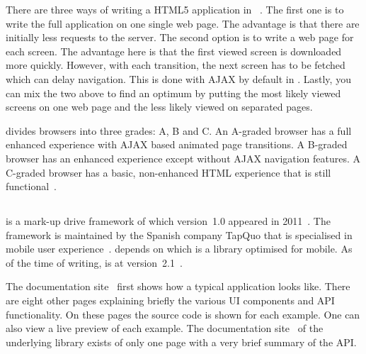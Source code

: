 \documentclass[a4paper]{artikel3}
\newcommand{\term}[1]{\emph{#1}}
\newcommand{\setspace}[0]{\vspace{2mm}}
\renewcommand{\paragraph}[1]{\setspace \noindent {\bf #1}  }
\begin{document}
There are three ways of writing a HTML5 application in \jqma{}~\cite{Broulik2012}. 
The first one is to write the full application on one single web page.
The advantage is that there are initially less requests to the server.
The second option is to write a web page for each screen. 
The advantage here is that the first viewed screen is downloaded more quickly. 
However, with each transition, the next screen has to be fetched which can delay navigation.
This is done with AJAX by default in \jqma{}.
Lastly, you can mix the two above to find an optimum by putting the most likely viewed screens on one web page and the less likely viewed on separated pages.  

\paragraph{Browser support}
\label{sec:jqm-browser-support}
\jqma{} divides browsers into three grades: A, B and C. 
An A-graded browser has a full enhanced experience with AJAX based animated page transitions.
A B-graded browser has an enhanced experience except without AJAX navigation features.
A C-graded browser has a basic, non-enhanced HTML experience that is still functional~\cite{JQuery2012d}.


\subsection{\lungo} %
\label{sec:frameworks-lungo}

\lungo{} is a mark-up drive framework of which version~1.0 appeared in 2011~\cite{TapQuo2011}.
The framework is maintained by the Spanish company TapQuo that is specialised in mobile user experience~\cite{TapQuo2013a}.
\lungo{} depends on  \quo{} which is a \js{} library optimised for mobile.
As of the time of writing, \lungo{} is at version~2.1~\cite{TapQuo2013}.

\paragraph{Documentation}
The documentation site~\cite{Lungo2013} first shows how a typical \lungo{} application looks like.
There are eight other pages explaining briefly the various UI components and API functionality.
On these pages the source code is shown for each example.
One can also view a live preview of each example.
The documentation site~\cite{TapQuo2013c} of the underlying \js{} library exists of only one page with a very brief summary of the API.
\end{document}
